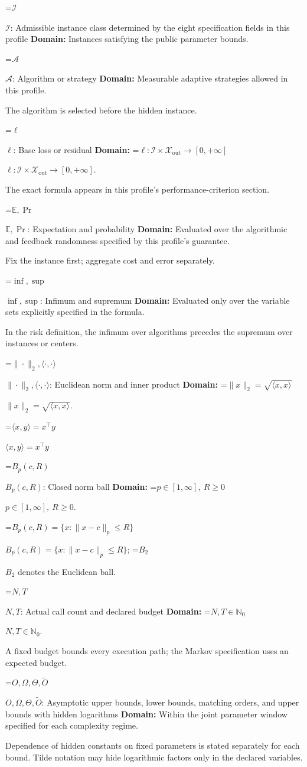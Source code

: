 \documentclass[10pt,a4paper]{article}
\newcommand{\AtlasMath}[1]{\par\begingroup\centering\setbox0=\hbox{$\displaystyle #1$}\ifdim\wd0>1.4\linewidth\typeout{ATLAS WIDE FORMULA: \the\wd0}\fi\ifdim\wd0>\linewidth\resizebox{\linewidth}{!}{\box0}\else\box0\fi\par\endgroup}
\newcommand{\AtlasInlineMath}[1]{\begingroup\setbox0=\hbox{$#1$}\ifdim\wd0>.4\linewidth\endgroup\AtlasMath{#1}\else\endgroup$#1$\fi}
\begin{document}
\AtlasInlineMath{\mathcal{I}}: Admissible instance class determined by the eight specification fields in this profile \textbf{Domain:} Instances satisfying the public parameter bounds.

\AtlasInlineMath{\mathcal{A}}: Algorithm or strategy \textbf{Domain:} Measurable adaptive strategies allowed in this profile.

The algorithm is selected before the hidden instance.

\AtlasInlineMath{\ell}: Base loss or residual \textbf{Domain:} \AtlasInlineMath{\ell:\mathcal{I}\times\mathcal{X}_{\mathrm{out}}\to[0,+\infty]}.

The exact formula appears in this profile's performance-criterion section.

\AtlasInlineMath{\mathbb{E},\Pr}: Expectation and probability \textbf{Domain:} Evaluated over the algorithmic and feedback randomness specified by this profile's guarantee.

Fix the instance first; aggregate cost and error separately.

\AtlasInlineMath{\inf,\sup}: Infimum and supremum \textbf{Domain:} Evaluated only over the variable sets explicitly specified in the formula.

In the risk definition, the infimum over algorithms precedes the supremum over instances or centers.

\AtlasInlineMath{\|\cdot\|_2,\langle\cdot,\cdot\rangle}: Euclidean norm and inner product \textbf{Domain:} \AtlasInlineMath{\|x\|_2=\sqrt{\langle x,x\rangle}}.

\AtlasInlineMath{\langle x,y\rangle=x^\top y}

\AtlasInlineMath{B_p(c,R)}: Closed norm ball \textbf{Domain:} \AtlasInlineMath{p\in[1,\infty],\ R\ge0}.

\AtlasInlineMath{B_p(c,R)=\{x:\|x-c\|_p\le R\}}; \AtlasInlineMath{B_2} denotes the Euclidean ball.

\AtlasInlineMath{N,T}: Actual call count and declared budget \textbf{Domain:} \AtlasInlineMath{N,T\in\mathbb{N}_0}.

A fixed budget bounds every execution path; the Markov specification uses an expected budget.

\AtlasInlineMath{O,\Omega,\Theta,\widetilde{O}}: Asymptotic upper bounds, lower bounds, matching orders, and upper bounds with hidden logarithms \textbf{Domain:} Within the joint parameter window specified for each complexity regime.

Dependence of hidden constants on fixed parameters is stated separately for each bound. Tilde notation may hide logarithmic factors only in the declared variables.
\end{document}
